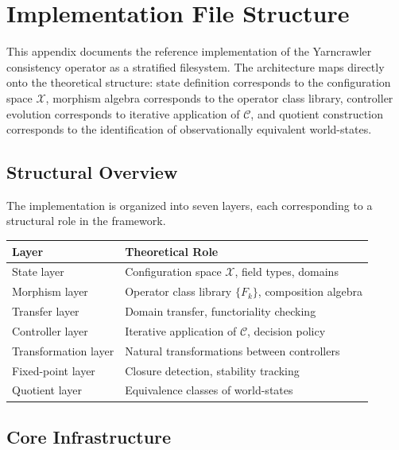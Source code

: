 \documentclass[12pt, oneside]{article}
\begin{document}
\section{Implementation File Structure}
\label{app:implementation}

This appendix documents the reference implementation of the Yarncrawler consistency
operator as a stratified filesystem. The architecture maps directly onto the theoretical
structure: state definition corresponds to the configuration space $\mathcal{X}$,
morphism algebra corresponds to the operator class library, controller evolution
corresponds to iterative application of $\mathcal{C}$, and quotient construction
corresponds to the identification of observationally equivalent world-states.

\subsection{Structural Overview}

The implementation is organized into seven layers, each corresponding to a structural
role in the framework.

\begin{center}
\begin{tabular}{ll}
\toprule
\textbf{Layer} & \textbf{Theoretical Role} \\
\midrule
State layer & Configuration space $\mathcal{X}$, field types, domains \\
Morphism layer & Operator class library $\{F_k\}$, composition algebra \\
Transfer layer & Domain transfer, functoriality checking \\
Controller layer & Iterative application of $\mathcal{C}$, decision policy \\
Transformation layer & Natural transformations between controllers \\
Fixed-point layer & Closure detection, stability tracking \\
Quotient layer & Equivalence classes of world-states \\
\bottomrule
\end{tabular}
\end{center}

\subsection{Core Infrastructure}
\end{document}
